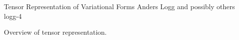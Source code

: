               {Tensor Representation of Variational Forms}
              {Anders Logg and possibly others}
              {logg-4}

Overview of tensor representation.
